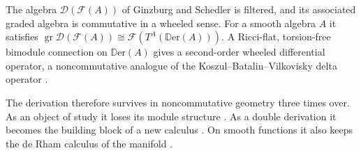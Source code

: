\begin{remark}
\label{rem:cohomology:ncg-fock}
The algebra $\mathcal{D}(\mathcal{F}(A))$ of Ginzburg and Schedler is
filtered, and its associated graded algebra is commutative in a wheeled
sense. For a smooth algebra $A$ it satisfies
$\operatorname{gr}\mathcal{D}(\mathcal{F}(A))\cong
\mathcal{F}(T^{A}(\mathbb{D}\mathrm{er}(A)))$. A Ricci-flat, torsion-free
bimodule connection on $\mathbb{D}\mathrm{er}(A)$ gives a second-order
wheeled differential operator, a noncommutative analogue of the
Koszul--Batalin--Vilkovisky delta operator
\cite[Abstract, p.~673]{GinzburgSchedler2010BV}.
\end{remark}

The derivation therefore survives in noncommutative geometry three times
over. As an object of study it loses its module structure
\cite[Abstract, p.~1]{Sardanashvily2007Dilemma}. As a double derivation
it becomes the building block of a new calculus
\cite[Abstract, p.~673]{GinzburgSchedler2010BV}. On smooth functions it
also keeps the de Rham calculus of the manifold
\cite[p.~1]{Sardanashvily2007Dilemma}. %
